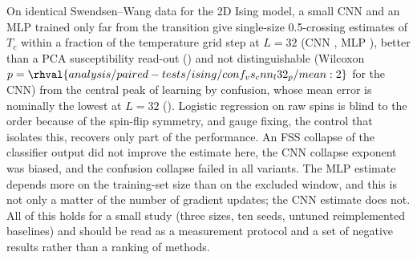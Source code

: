 On identical Swendsen--Wang data for the 2D Ising model, a small CNN and an MLP trained only far from the transition give single-size 0.5-crossing estimates of $T_c$ within a fraction of the temperature grid step at $L=32$ (CNN , MLP ), better than a PCA susceptibility read-out () and not distinguishable (Wilcoxon $p=\rhval{analysis/paired-tests/ising/conf_vs_cnn_l32_p/mean:2}$ for the CNN) from the central peak of learning by confusion, whose mean error is nominally the lowest at $L=32$ (). Logistic regression on raw spins is blind to the order because of the spin-flip symmetry, and gauge fixing, the control that isolates this, recovers only part of the performance. An FSS collapse of the classifier output did not improve the estimate here, the CNN collapse exponent was biased, and the confusion collapse failed in all variants. The MLP estimate depends more on the training-set size than on the excluded window, and this is not only a matter of the number of gradient updates; the CNN estimate does not. All of this holds for a small study (three sizes, ten seeds, untuned reimplemented baselines) and should be read as a measurement protocol and a set of negative results rather than a ranking of methods.

